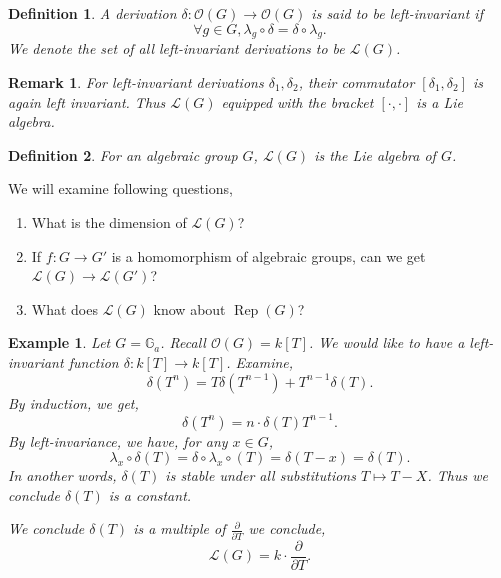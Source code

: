 \documentclass[10pt]{article}
\newtheorem{definition}{Definition}[section]
\newtheorem{remark}{Remark}[section]
\newtheorem{example}{Example}[section]
\numberwithin{equation}{theorem}
\DeclareMathOperator{\Rep}{Rep}
\newcommand{\Ouv}[0]{\mathcal{O}}
\newcommand{\G}[0]{\mathbb{G}}
\newcommand{\Lie}[0]{\mathcal{L}}
\begin{document}
\begin{definition}
  A derivation $\delta:\Ouv(G)\to\Ouv(G)$ is said to be left-invariant if 
  \begin{equation*}
    \forall g\in G, \lambda_g\circ\delta = \delta\circ\lambda_g.
  \end{equation*}
  We denote the set of all left-invariant derivations to be $\mathcal{L}(G)$.
\end{definition}
\begin{remark}
  For left-invariant derivations $\delta_1,\delta_2$, their commutator $[\delta_1,\delta_2]$ is again left invariant. Thus $\mathcal{L}(G)$ equipped with the bracket $[\cdot,\cdot]$ is a Lie algebra.
\end{remark}

\begin{definition}
  For an algebraic group $G$, $\mathcal{L}(G)$ is the Lie algebra of $G$.
\end{definition}

We will examine following questions,

\begin{enumerate}
  \item What is the dimension of $\mathcal{L}(G)$?
  \item If $f:G\to G'$ is a homomorphism of algebraic groups, can we get $\Lie(G)\to\Lie(G')$?
  \item What does $\Lie(G)$ know about $\Rep(G)$?
\end{enumerate}

\begin{example}
  \label{example_5_3}
  Let $G = \G_a$. Recall $\Ouv(G) = k[T]$. We would like to have a left-invariant function $\delta:k[T]\to k[T]$. Examine,
  \begin{equation*}
    \delta(T^n) = T\delta(T^{n-1})+T^{n-1}\delta(T).
  \end{equation*}
  By induction, we get,
  \begin{equation*}
    \delta(T^n) = n\cdot\delta(T)T^{n-1}.
  \end{equation*}
  By left-invariance, we have, for any $x\in G$, 
  \begin{equation*}
    \lambda_x\circ\delta(T) = \delta\circ\lambda_x\circ(T) = \delta(T-x) = \delta(T).
  \end{equation*}
  In another words, $\delta(T)$ is stable under all substitutions $T\mapsto T-X$. Thus we conclude $\delta(T)$ is a constant.
  \par We conclude $\delta(T)$ is a multiple of ${\frac {\partial} {\partial T}}$ we conclude,
  \begin{equation*}
    \Lie(G) = k\cdot{\frac {\partial}{\partial T}}.
  \end{equation*}
\end{example}
\end{document}
